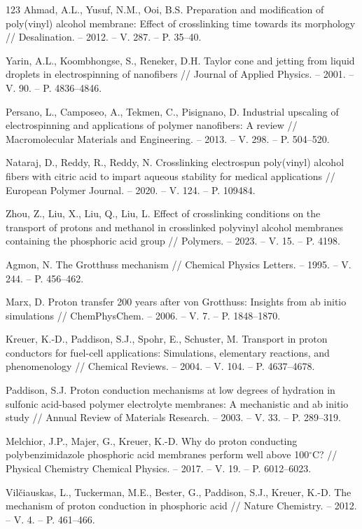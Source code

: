 \documentclass[12pt,a4paper]{report}
\begin{document}
\begin{thebibliography}{123}
 Ahmad, A.L., Yusuf, N.M., Ooi, B.S. Preparation and modification of poly(vinyl) alcohol membrane: Effect of crosslinking time towards its morphology // Desalination. – 2012. – V. 287. – P. 35–40.

 Yarin, A.L., Koombhongse, S., Reneker, D.H. Taylor cone and jetting from liquid droplets in electrospinning of nanofibers // Journal of Applied Physics. – 2001. – V. 90. – P. 4836–4846.

 Persano, L., Camposeo, A., Tekmen, C., Pisignano, D. Industrial upscaling of electrospinning and applications of polymer nanofibers: A review // Macromolecular Materials and Engineering. – 2013. – V. 298. – P. 504–520.

 Nataraj, D., Reddy, R., Reddy, N. Crosslinking electrospun poly(vinyl) alcohol fibers with citric acid to impart aqueous stability for medical applications // European Polymer Journal. – 2020. – V. 124. – P. 109484.

 Zhou, Z., Liu, X., Liu, Q., Liu, L. Effect of crosslinking conditions on the transport of protons and methanol in crosslinked polyvinyl alcohol membranes containing the phosphoric acid group // Polymers. – 2023. – V. 15. – P. 4198.

 Agmon, N. The Grotthuss mechanism // Chemical Physics Letters. – 1995. – V. 244. – P. 456–462.

 Marx, D. Proton transfer 200 years after von Grotthuss: Insights from ab initio simulations // ChemPhysChem. – 2006. – V. 7. – P. 1848–1870.

 Kreuer, K.-D., Paddison, S.J., Spohr, E., Schuster, M. Transport in proton conductors for fuel-cell applications: Simulations, elementary reactions, and phenomenology // Chemical Reviews. – 2004. – V. 104. – P. 4637–4678.

 Paddison, S.J. Proton conduction mechanisms at low degrees of hydration in sulfonic acid-based polymer electrolyte membranes: A mechanistic and ab initio study // Annual Review of Materials Research. – 2003. – V. 33. – P. 289–319.

 Melchior, J.P., Majer, G., Kreuer, K.-D. Why do proton conducting polybenzimidazole phosphoric acid membranes perform well above 100\(^\circ\)C? // Physical Chemistry Chemical Physics. – 2017. – V. 19. – P. 6012–6023.

 Vilčiauskas, L., Tuckerman, M.E., Bester, G., Paddison, S.J., Kreuer, K.-D. The mechanism of proton conduction in phosphoric acid // Nature Chemistry. – 2012. – V. 4. – P. 461–466.


\end{thebibliography}
\end{document}
